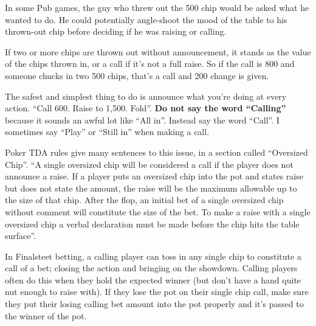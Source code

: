 In some Pub games, the guy who threw out the 500 chip would be asked
what he wanted to do. He could potentially angle-shoot the mood
of the table to his thrown-out chip before deciding if he was
raising or calling.

If two or more chips are thrown out without announcement, it stands
as the value of the chips thrown in, or a call if it's not a full
raise. So if the call is 800 and someone chucks in two 500 chips,
that's a call and 200 change is given.

The safest and simplest thing to do is announce what you're doing
at every action. ``Call 600. Raise to 1,500. Fold''. \textbf{Do not
say the word ``Calling''} because it sounds an awful lot like ``All
in''. Instead say the word ``Call''. I sometimes say ``Play'' or
``Still in'' when making a call.

Poker TDA rules give many sentences to this issue, in a section
called ``Oversized Chip''. ``A single oversized chip will be considered
a call if the player does not announce a raise. If a player puts an
oversized chip into the pot and states raise but does not state the
amount, the raise will be the maximum allowable up to the size of that
chip. After the flop, an initial bet of a single oversized chip
without comment will constitute the size of the bet. To make a raise
with a single oversized chip a verbal declaration must be made
before the chip hits the table surface''.

In Finalsteet betting, a calling player can toss in any single chip to
constitute a call of a bet; closing the action and bringing on the
showdown. Calling players often do this when they hold the expected
winner (but don't have a hand quite nut enough to raise with). If they
lose the pot on their single chip call, make sure they put their
losing calling bet amount into the pot properly and it's passed to the
winner of the pot.




